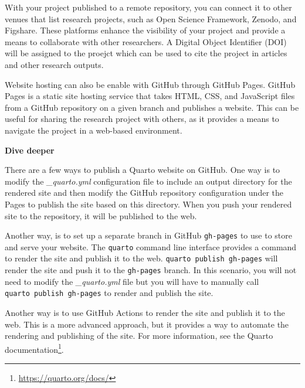 \documentclass[
  letterpaper,
  krantz1]{latex/krantz-mod}
\theoremstyle{definition}
\theoremstyle{definition}
\theoremstyle{remark}
\DeclareRobustCommand{\href}[2]{#2\footnote{\url{#1}}}
\begin{document}
With your project published to a remote repository, you can connect it
to other venues that list research projects, such as Open Science
Framework, Zenodo, and Figshare. These platforms enhance the visibility
of your project and provide a means to collaborate with other
researchers. A Digital Object Identifier (DOI) will be assigned to the
proejct which can be used to cite the project in articles and other
research outputs.

Website hosting can also be enable with GitHub through GitHub Pages.
GitHub Pages is a static site hosting service that takes HTML, CSS, and
JavaScript files from a GitHub repository on a given branch and
publishes a website. This can be useful for sharing the research project
with others, as it provides a means to navigate the project in a
web-based environment.

\begin{tcolorbox}[enhanced jigsaw, leftrule=.75mm, colframe=quarto-callout-color-frame, left=2mm, colback=white, toprule=.15mm, breakable, arc=.35mm, opacityback=0, bottomrule=.15mm, rightrule=.15mm]

\textbf{ Dive deeper}

There are a few ways to publish a Quarto website on GitHub. One way is
to modify the \emph{\_quarto.yml} configuration file to include an
output directory for the rendered site and then modify the GitHub
repository configuration under the Pages to publish the site based on
this directory. When you push your rendered site to the repository, it
will be published to the web.

Another way, is to set up a separate branch in GitHub \texttt{gh-pages}
to use to store and serve your website. The \texttt{quarto} command line
interface provides a command to render the site and publish it to the
web. \texttt{quarto\ publish\ gh-pages} will render the site and push it
to the \texttt{gh-pages} branch. In this scenario, you will not need to
modify the \emph{\_quarto.yml} file but you will have to manually call
\texttt{quarto\ publish\ gh-pages} to render and publish the site.

Another way is to use GitHub Actions to render the site and publish it
to the web. This is a more advanced approach, but it provides a way to
automate the rendering and publishing of the site. For more information,
see the \href{https://quarto.org/docs/}{Quarto documentation}.

\end{tcolorbox}
\end{document}
